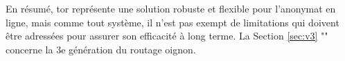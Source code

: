 En résumé, \acrshort{tor} représente une solution robuste et flexible pour l'anonymat en ligne, mais comme tout système, il n'est pas exempt de limitations qui doivent être adressées pour assurer son efficacité à long terme.
La Section \ref{sec:v3} "" concerne la 3e génération du routage oignon.
